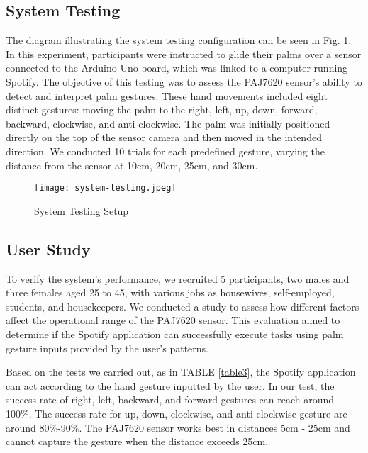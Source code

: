 \documentclass[conference,a4paper]{IEEEtran}
\begin{document}
\subsection{System Testing}

The diagram illustrating the system testing configuration can be seen in Fig. \ref{fig:system-testing-setup}. In this experiment, participants were instructed to glide their palms over a sensor connected to the Arduino Uno board, which was linked to a computer running Spotify. The objective of this testing was to assess the PAJ7620 sensor's ability to detect and interpret palm gestures. These hand movements included eight distinct gestures: moving the palm to the right, left, up, down, forward, backward, clockwise, and anti-clockwise. The palm was initially positioned directly on the top of the sensor camera and then moved in the intended direction. We conducted 10 trials for each predefined gesture, varying the distance from the sensor at 10cm, 20cm, 25cm, and 30cm.

\begin{figure}[hbt!]
    \centering
    \texttt{[image: system-testing.jpeg]}
    \caption{System Testing Setup}
    \label{fig:system-testing-setup}
\end{figure}


\subsection{User Study}
To verify the system's performance, we recruited 5 participants, two males and three females aged 25 to 45, with various jobs as housewives, self-employed, students, and housekeepers. We conducted a study to assess how different factors affect the operational range of the PAJ7620 sensor. This evaluation aimed to determine if the Spotify application can successfully execute tasks using palm gesture inputs provided by the user's patterns.

Based on the tests we carried out, as in TABLE \ref{table3}, the Spotify application can act according to the hand gesture inputted by the user. In our test, the success rate of right, left, backward, and forward gestures can reach around 100\%. The success rate for up, down, clockwise, and anti-clockwise gesture are around 80\%-90\%. The PAJ7620 sensor works best in distances 5cm - 25cm and cannot capture the gesture when the distance exceeds 25cm.
\end{document}
